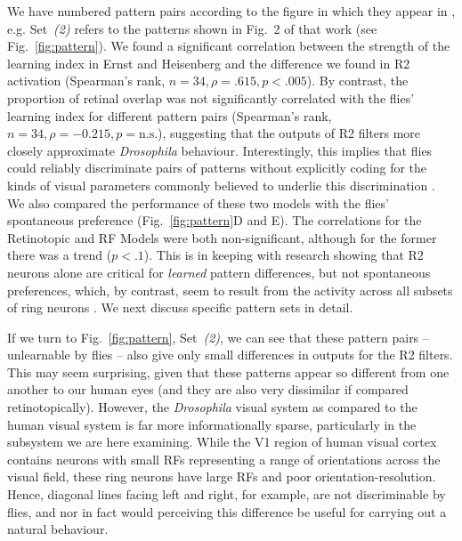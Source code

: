 We have numbered pattern pairs according to the figure in which they appear in \cite{Ernst1999}, e.g. Set~\emph{(2)} refers to the patterns shown in Fig.~2 of that work (see Fig.~\ref{fig:pattern}).
We found a significant correlation between the strength of the learning index in Ernst and Heisenberg \cite{Ernst1999} and the difference we found in R2 activation (Spearman's rank, $n=34, \rho=.615, p<.005$).
By contrast, the proportion of retinal overlap was not significantly correlated with the flies' learning index for different pattern pairs (Spearman's rank, $n=34, \rho= -0.215, p=\mathrm{n.s.}$), suggesting that the outputs of R2 filters more closely approximate \emph{Drosophila} behaviour.
Interestingly, this implies that flies could reliably discriminate pairs of patterns without explicitly coding for the kinds of visual parameters commonly believed to underlie this discrimination \cite{Pan2009,Liu2006,Ernst1999}.
We also compared the performance of these two models with the flies' spontaneous preference (Fig.~\ref{fig:pattern}D and E).
The correlations for the Retinotopic and RF Models were both non-significant, although for the former there was a trend ($p<.1$).
This is in keeping with research showing that R2 neurons alone are critical for \emph{learned} pattern differences, but not spontaneous preferences, which, by contrast, seem to result from the activity across all subsets of ring neurons \texthl{[cit]}.
We next discuss specific pattern sets in detail.


If we turn to Fig.~\ref{fig:pattern}, Set~\emph{(2)}, we can see that these pattern pairs -- unlearnable by flies -- also give only small differences in outputs for the R2 filters.
This may seem surprising, given that these patterns appear so different from one another to our human eyes (and they are also very dissimilar if compared retinotopically).
However, the \emph{Drosophila} visual system as compared to the human visual system is far more informationally sparse, particularly in the subsystem we are here examining.
While the V1 region of human visual cortex contains neurons with small RFs representing a range of orientations across the visual field, these ring neurons have large RFs and poor orientation-resolution.
Hence, diagonal lines facing left and right, for example, are not discriminable by flies, and nor in fact would perceiving this difference be useful for carrying out a natural behaviour.

